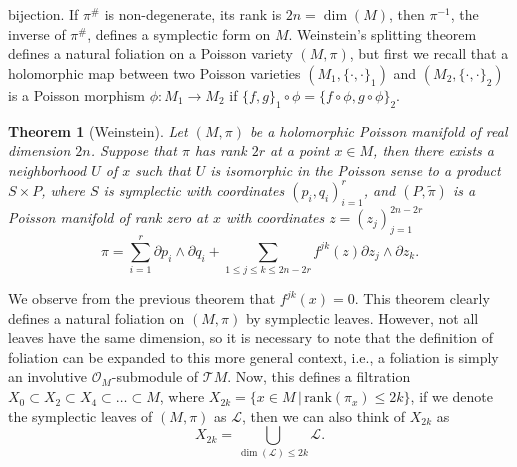 \documentclass{article}
\newtheorem{theorem}{Theorem}
\begin{document}
bijection. If $\pi^{\#}$ is non-degenerate, its rank is $2n=\dim(M)$, then $\pi^{-1}$, the inverse of $\pi^{\#}$, defines a symplectic form
on $M$. Weinstein's splitting theorem defines a natural foliation on a Poisson variety $(M,\pi)$, but first
we recall that a holomorphic map between two Poisson varieties $(M_1,\{\cdot,\cdot\}_1)$ and $(M_2,\{\cdot,\cdot\}_2)$ is a Poisson morphism
$\phi:M_1\rightarrow M_2$ if $\{f,g\}_1\circ\phi=\{f\circ\phi,g\circ\phi\}_2$.
\begin{theorem}[Weinstein]\label{weins}
        Let $(M,\pi)$ be a holomorphic Poisson manifold of real dimension $2n$. Suppose that $\pi$ has rank $2r$ at a point $x\in M$,
        then there exists a neighborhood $U$ of $x$ such that $U$ is isomorphic in the Poisson sense to a product $S\times P$, where $S$ is
        symplectic with coordinates $(p_i,q_i)_{i=1}^r$, and $(P,\tilde{\pi})$ is a Poisson manifold of rank zero at $x$
        with coordinates $z=(z_j)_{j=1}^{2n-2r}$
        \[
                \pi=\sum_{i=1}^r \partial{p_i}\wedge\partial{q_i}+\sum_{1\leq j\leq k\leq 2n-2r} f^{jk}(z)\partial{z_j}\wedge\partial{z_k}.
        \]
\end{theorem}
\noindent We observe from the previous theorem that $f^{jk}(x)=0$. This theorem clearly defines a natural foliation on $(M,\pi)$ by
symplectic leaves. However, not all leaves have the same dimension, so it is necessary to note that the definition of foliation
can be expanded to this more general context, i.e., a foliation is simply an involutive $\mathcal{O}_M$-submodule of $\mathcal{T}M$.
Now, this defines a filtration $X_0\subset X_2\subset X_4\subset\dots\subset M$, where $X_{2k}=\{x\in M\,|\,\textrm{rank}(\pi_x)\leq 2k\}$,
if we denote the symplectic leaves of $(M,\pi)$ as $\mathcal{L}$, then we can also think of $X_{2k}$ as
$$
X_{2k}=\bigcup_{\dim(\mathcal{L})\leq 2k}\mathcal{L}.
$$
\end{document}
